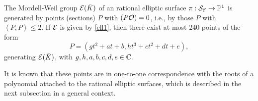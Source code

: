\documentclass[11pt]{amsart}
\begin{document}
\begin{thm}
	\label{shi2}
	The Mordell-Weil  group  ${\mathcal E}({{\bar K}})$ of an rational elliptic surface	$\pi: {\mathcal S}_{\mathcal E} \rightarrow {\mathbb P}^1 $  is generated by points (sections) $P$ with $(P{\mathcal O})=0$, i.e.,
	by those $P$ with $ \left\langle P, P \right\rangle  \leq 2$.
	If $ {\mathcal E}$ is given by \eqref{ell1}, then 
	there exist
	at most $240$ points of the form 
	$$P=(g t^2+ a t +b, h t^3+ c t^2 + d t + e),$$
	generating ${\mathcal E}({{\bar K}})$, with $g, h, a, b, c, d, e \in {\mathbb C}$.
\end{thm}






It is known that these points are in one-to-one correspondence with  the  roots of a polynomial
attached to the rational elliptic surfaces, which is described in the next subsection in a general context.
\end{document}
